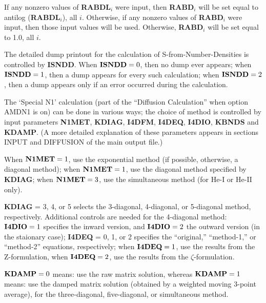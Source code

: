 \ej
\centerline{}
\space \noindent
If any nonzero values of {\bf RABDL}$_i$ were input, then {\bf RABD}$_i$ 
will be set equal to antilog ({\bf RABDL}$_i$), all $i$.
Otherwise, if any nonzero values of {\bf RABD}$_i$ were input,
then those input values  will be used.
Otherwise, {\bf RABD}$_i$ will be set equal to 1.0, all $i$.
\blankline
\blankline
\centerline{}
\space \noindent
The detailed dump printout for the calculation of S-from-Number-Densities is controlled
by {\bf ISNDD}. When ${\bf ISNDD} = 0$, then no dump ever appears; when ${\bf ISNDD} = 1$,
then a dump appears for every such calculation; when ${\bf ISNDD} = 2$, then a dump
appears only if an error occurred during the calculation.
\blankline
\blankline
\centerline{}
\space \noindent
The `Special N1' calculation (part of the ``Diffusion Calculation'' when
option AMDN1 is on) can be done in various ways; the choice of method is controlled by
input parameters {\bf N1MET}, {\bf KDIAG}, {\bf I4DFM}, {\bf I4DEQ}, {\bf I4DIO},
{\bf KBNDS} and {\bf KDAMP}. (A more detailed explanation of these parameters appears
in sections INPUT and DIFFUSION of the main output file.)

When ${\bf N1MET} = 1$, use the exponential method (if possible, otherwise, a diagonal
method); when ${\bf N1MET} = 1$, use the diagonal method specified by {\bf KDIAG};
when ${\bf N1MET} = 3$, use the simultaneous method (for He-I or He-II only).

{\bf KDIAG} = 3, 4, or 5 selects the 3-diagonal, 4-diagonal, or 5-diagonal \break
method, respectively. Additional controls are needed for the 4-diagonal method:
${\bf I4DIO} = 1$ specifies the inward version, and ${\bf I4DIO} = 2$ the outward
version (in the staionary case); {\bf I4DEQ} = 0, 1, or 2 specifies the ``original,''
``method-1,'' or ``method-2'' equations, respectively; when ${\bf I4DEQ} = 1$, use
the results from the Z-formulation, when ${\bf I4DEQ} = 2$, use the results from
the $\zeta$-formulation.

${\bf KDAMP} = 0$ means: use the raw matrix solution, whereas ${\bf KDAMP} = 1$ means:
use the damped matrix solution (obtained by a weighted moving 3-point average), for
the three-diagonal, five-diagonal, or simultaneous method.

